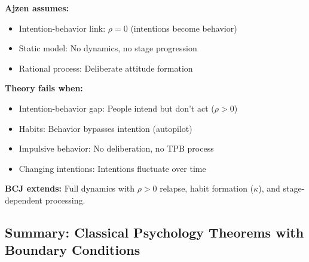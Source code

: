 \begin{tcolorbox}[colback=red!5!white, colframe=red!75!black,
    title=Boundary Condition: Where Ajzen Fails]
\textbf{Ajzen assumes:}
\begin{itemize}[nosep]
\item Intention-behavior link: $\rho = 0$ (intentions become behavior)
\item Static model: No dynamics, no stage progression
\item Rational process: Deliberate attitude formation
\end{itemize}

\textbf{Theory fails when:}
\begin{itemize}[nosep]
\item Intention-behavior gap: People intend but don't act ($\rho > 0$)
\item Habits: Behavior bypasses intention (autopilot)
\item Impulsive behavior: No deliberation, no TPB process
\item Changing intentions: Intentions fluctuate over time
\end{itemize}

\textbf{BCJ extends:} Full dynamics with $\rho > 0$ relapse, habit formation ($\kappa$), and stage-dependent processing.
\end{tcolorbox}


\subsection{Summary: Classical Psychology Theorems with Boundary Conditions}


